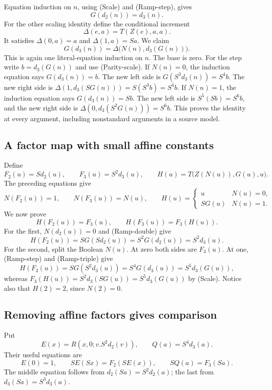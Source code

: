 Equation induction on $n$, using (Scale) and (Ramp-step), gives
\[
                              G(d_2(n))=d_3(n).       \tag{Ramp-double}
\]
For the other scaling identity define the conditional increment
\[
                    \Delta(e,a)=T(Z(e),a,a).
\]
It satisfies $\Delta(0,a)=a$ and $\Delta(1,a)=Sa$. We claim
\[
          G(d_3(n))=\Delta\bigl(N(n),d_3(G(n))\bigr). \tag{Ramp-triple}
\]
This is again one literal-equation induction on $n$. The base is zero.
For the step write $b=d_3(G(n))$ and use (Parity-scale). If $N(n)=0$,
the induction equation says $G(d_3(n))=b$. The new left side is
$G(S^3d_3(n))=S^4b$. The new right side is
$\Delta(1,d_3(SG(n)))=S(S^3b)=S^4b$.
If $N(n)=1$, the induction equation says $G(d_3(n))=Sb$.
The new left side is $S^5(Sb)=S^6b$, and the new right side is
$\Delta(0,d_3(S^2G(n)))=S^6b$. This proves the identity at every
argument, including nonstandard arguments in a source model.

\subsection{A factor map with small affine constants}

Define
\[
 F_2(u)=S d_2(u),\qquad F_3(u)=S^2d_3(u),\qquad
 H(u)=T\bigl(Z(N(u)),G(u),u\bigr).
\]
The preceding equations give
\[
 N(F_2(u))=1,\qquad N(F_3(u))=N(u),\qquad
 H(u)=\begin{cases}u&N(u)=0,\\SG(u)&N(u)=1.\end{cases}             \tag{Factor-cases}
\]
We now prove
\[
                H(F_2(u))=F_3(u),\qquad
                H(F_3(u))=F_3(H(u)).                  \tag{Factor}
\]
For the first, $N(d_2(u))=0$ and (Ramp-double) give
\[
 H(F_2(u))=S G(Sd_2(u))=S^2G(d_2(u))=S^2d_3(u).
\]
For the second, split the Boolean $N(u)$. At zero both sides are
$F_3(u)$. At one, (Ramp-step) and (Ramp-triple) give
\[
 H(F_3(u))=S G(S^2d_3(u))=S^4G(d_3(u))=S^5d_3(G(u)),
\]
whereas $F_3(H(u))=S^2d_3(SG(u))=S^5d_3(G(u))$ by (Scale).
Notice also that $H(2)=2$, since $N(2)=0$.

\subsection{Removing affine factors gives comparison}

Put
\[
 E(x)=R(x,0;v.S^2d_2(v)),\qquad Q(a)=S^4d_3(a).
\]
Their useful equations are
\[
 E(0)=1,\qquad S E(Sx)=F_2(S E(x)),\qquad S Q(a)=F_3(Sa).          \tag{Seeds}
\]
The middle equation follows from $d_2(Sa)=S^2d_2(a)$; the last from
$d_3(Sa)=S^3d_3(a)$.

